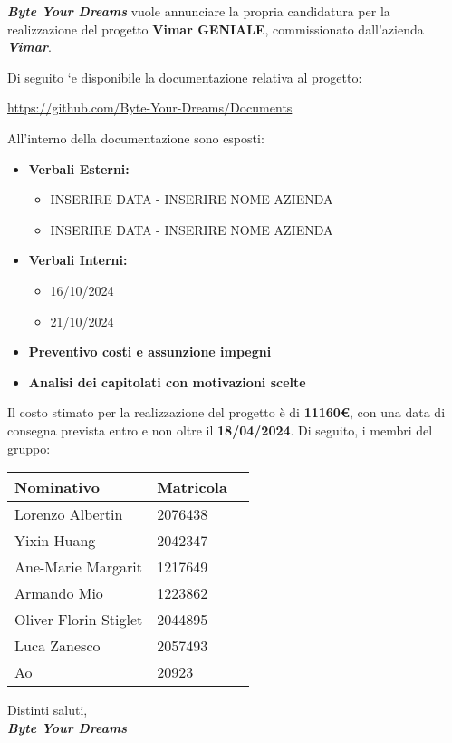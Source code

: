 \documentclass{article}
\begin{document}
\textbf{\textit{Byte Your Dreams}} vuole annunciare la propria candidatura per la realizzazione del progetto
\textbf{Vimar GENIALE}, commissionato dall’azienda \textbf{\textit{Vimar}}.
\bigskip

Di seguito `e disponibile la documentazione relativa al progetto:
\begin{center}
    \url{https://github.com/Byte-Your-Dreams/Documents}
\end{center}

All'interno della documentazione sono esposti:
\begin{itemize}
    \item \textbf{Verbali Esterni:}
        \begin{itemize}
        \item INSERIRE DATA - INSERIRE NOME AZIENDA
        \item INSERIRE DATA - INSERIRE NOME AZIENDA
    \end{itemize}
    \item \textbf{Verbali Interni:}
            \begin{itemize}
                \item 16/10/2024
                \item 21/10/2024
            \end{itemize}
    \item \textbf{Preventivo costi e assunzione impegni}
    \item \textbf{Analisi dei capitolati con motivazioni scelte}
\end{itemize}

Il costo stimato per la realizzazione del progetto è di \textbf{11160\euro}, con una data di consegna prevista entro e non oltre il \textbf{18/04/2024}.
\bigskip
Di seguito, i membri del gruppo:

\begin{center}
\begin{tabular}{|l|l|l|}
\hline
\textbf{Nominativo} & \textbf{Matricola}\\ \hline
Lorenzo Albertin & 2076438\\
Yixin Huang & 2042347\\
Ane-Marie Margarit & 1217649\\
Armando Mio & 1223862\\
Oliver Florin Stiglet & 2044895\\
Luca Zanesco & 2057493\\
Ao & 20923
\hline
\end{tabular}
\end{center}

\bigskip
\begin{flushright}Distinti saluti, \\
\textit{\textbf{Byte Your Dreams}}\end{flushright}
\end{document}
